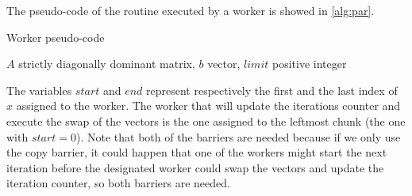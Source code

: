 \documentclass[12pt]{article}
\begin{document}
	The pseudo-code of the routine executed by a worker is showed in \ref{alg:par}.
	\begin{algorithm}[H]
		\caption{Worker pseudo-code}\label{alg:par}
		\begin{algorithmic}[1]
			\Require $A$ strictly diagonally dominant matrix, $b$ vector, $limit$ positive integer
			\EndIf
			\EndFor
			\EndFor
			\EndIf
			\EndWhile
		\end{algorithmic}
	\end{algorithm}
	\noindent The variables $start$ and $end$ represent respectively the first and the last index of $x$ assigned to the worker. The worker that will update the iterations counter and execute the swap of the vectors is the one assigned to the leftmost chunk (the one with $start = 0$). Note that both of the barriers are needed because if we only use the copy barrier, it could happen that one of the workers might start the next iteration before the designated worker could swap the vectors and update the iteration counter, so both barriers are needed. 
	
	
\end{document}
